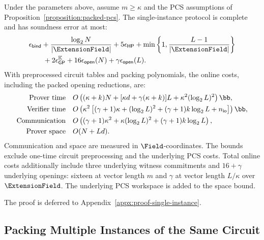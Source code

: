 \begin{theorem}
\label{theorem:single-instance-packing}
Under the parameters above, assume \(m\geq\kappa\) and the PCS
assumptions of Proposition~\ref{proposition:packed-pcs}.
The single-instance protocol is complete and has soundness error
at most:
\begin{equation}
\begin{aligned}
    &\epsilon_{\mathsf{bind}}
       +\frac{\log_2N}{|\ExtensionField|}
       +5\epsilon_{\mathsf{HP}}
       +\min\left\{1,\frac{L-1}{|\ExtensionField|}\right\}\\
    &\qquad{}
       +2\epsilon_{\mathsf{GP}}^{\mathbb K}
       +16\epsilon_{\mathsf{open}}(N)
       +\gamma\epsilon_{\mathsf{open}}(L).
\end{aligned}
\label{eq:together-soundness}
\end{equation}
With preprocessed circuit tables and packing polynomials, the
online costs, including the packed opening reductions, are:
\begin{equation}
\begin{aligned}
    \text{Prover time}\quad
       &O\left((\kappa+k)N+
          [\kappa d+\gamma(\kappa+k)]L
          +\kappa^2(\log_2L)^2\right)\bb,\\
    \text{Verifier time}\quad
       &O\left(\kappa^2\left[
          (\gamma+1)\kappa+(\log_2L)^2
          +(\gamma+1)k\log_2L+n_{\mathsf{io}}
          \right]\right)\bb,\\
    \text{Communication}\quad
       &O\left((\gamma+1)\kappa^2+\kappa(\log_2L)^2
          +(\gamma+1)k\log_2L\right),\\
    \text{Prover space}\quad
       &O(N+Ld).
\end{aligned}
\label{eq:together-single-efficiency}
\end{equation}
Communication and space are measured in \(\Field\)-coordinates.
The bounds exclude one-time circuit preprocessing and the
underlying PCS costs. Total online costs additionally include
three underlying witness commitments and \(16+\gamma\)
underlying openings: sixteen at vector length \(m\) and
\(\gamma\) at vector length \(L/\kappa\) over \(\ExtensionField\).
The underlying PCS workspace is added to the space bound.
\end{theorem}

The proof is deferred to Appendix~\ref{appx:proof-single-instance}.

\subsection{Packing Multiple Instances of the Same Circuit}
\label{sec:multi-instance-packing}

